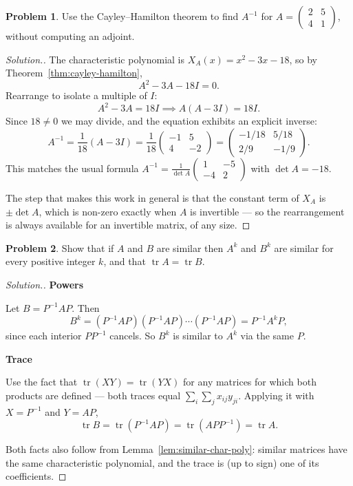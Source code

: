 \documentclass[11pt,a4paper]{article}
\theoremstyle{definition}
\newtheorem{problemx}{Problem}[section]
\newenvironment{problem}{\begin{problemx}}{\end{problemx}}
\newenvironment{solution}
  {\renewcommand{\qedsymbol}{}\begin{proof}[\textit{Solution}.]}
  {\end{proof}}
\newcommand{\subhead}[1]{%
  \par\medskip\noindent\textbf{#1}\par\nobreak\smallskip}
\begin{document}
\begin{problem}
Use the Cayley--Hamilton theorem to find $A^{-1}$ for
$A=\begin{pmatrix}2&5\\4&1\end{pmatrix}$, without computing an adjoint.
\end{problem}
\begin{solution}
The characteristic polynomial is $X_A(x)=x^2-3x-18$, so by
Theorem~\ref{thm:cayley-hamilton},
$$A^2-3A-18I=0.$$
Rearrange to isolate a multiple of $I$:
$$A^2-3A=18I\implies A(A-3I)=18I.$$
Since $18\neq 0$ we may divide, and the equation exhibits an explicit inverse:
$$A^{-1}=\frac{1}{18}(A-3I)
=\frac{1}{18}\begin{pmatrix}-1&5\\4&-2\end{pmatrix}
=\begin{pmatrix}-1/18&5/18\\2/9&-1/9\end{pmatrix}.$$
This matches the usual formula
$A^{-1}=\frac{1}{\det A}\begin{pmatrix}1&-5\\-4&2\end{pmatrix}$ with
$\det A=-18$.

The step that makes this work in general is that the constant term of $X_A$ is
$\pm\det A$, which is non-zero exactly when $A$ is invertible --- so the
rearrangement is always available for an invertible matrix, of any size.
\end{solution}

\begin{problem}
Show that if $A$ and $B$ are similar then $A^k$ and $B^k$ are similar for every
positive integer $k$, and that $\operatorname{tr}A=\operatorname{tr}B$.
\end{problem}
\begin{solution}
\subhead{Powers}
Let $B=P^{-1}AP$. Then
$$B^k=(P^{-1}AP)(P^{-1}AP)\cdots(P^{-1}AP)=P^{-1}A^kP,$$
since each interior $PP^{-1}$ cancels. So $B^k$ is similar to $A^k$ via the
same $P$.

\subhead{Trace}
Use the fact that $\operatorname{tr}(XY)=\operatorname{tr}(YX)$ for any
matrices for which both products are defined --- both traces equal
$\sum_i\sum_j x_{ij}y_{ji}$. Applying it with $X=P^{-1}$ and $Y=AP$,
$$\operatorname{tr}B=\operatorname{tr}(P^{-1}AP)=\operatorname{tr}(APP^{-1})
=\operatorname{tr}A.$$

Both facts also follow from Lemma~\ref{lem:similar-char-poly}: similar matrices
have the same characteristic polynomial, and the trace is (up to sign) one of
its coefficients.
\end{solution}
\end{document}
